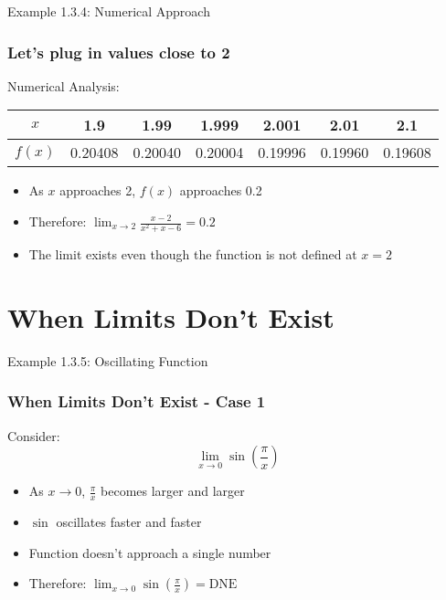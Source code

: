 \documentclass[aspectratio=169]{beamer}
\newcommand{\limx}[2]{\lim_{x \to #1} #2}
\begin{document}
\begin{frame}{Example 1.3.4: Numerical Approach}
\frametitle{Let's plug in values close to 2}

\begin{block}{Numerical Analysis:}
\begin{center}
\begin{tabular}{|c|c|c|c|c|c|c|}
\hline
$x$ & 1.9 & 1.99 & 1.999 & 2.001 & 2.01 & 2.1 \\
\hline
$f(x)$ & 0.20408 & 0.20040 & 0.20004 & 0.19996 & 0.19960 & 0.19608 \\
\hline
\end{tabular}
\end{center}
\end{block}

\begin{itemize}
\item As $x$ approaches 2, $f(x)$ approaches 0.2
\item Therefore: $\limx{2}{\frac{x-2}{x^2+x-6}} = 0.2$
\item The limit exists even though the function is not defined at $x = 2$
\end{itemize}

\end{frame}

\section{When Limits Don't Exist}

\begin{frame}{Example 1.3.5: Oscillating Function}
\frametitle{When Limits Don't Exist - Case 1}

\begin{block}{Consider:}
$$\limx{0}{\sin\left(\frac{\pi}{x}\right)}$$
\end{block}

\begin{center}
\end{center}

\begin{itemize}
\item As $x \to 0$, $\frac{\pi}{x}$ becomes larger and larger
\item $\sin$ oscillates faster and faster
\item Function doesn't approach a single number
\item Therefore: $\limx{0}{\sin\left(\frac{\pi}{x}\right)} = \text{DNE}$
\end{itemize}

\end{frame}
\end{document}
